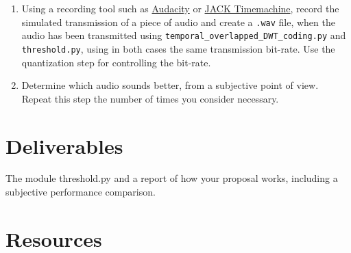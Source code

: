 \begin{enumerate}
\item Using a recording tool such as
  \href{http://audacity.sourceforge.net}{Audacity} or
  \href{http://plugin.org.uk/timemachine/}{JACK Timemachine}, record
  the simulated transmission of a piece of audio and create a
  \texttt{.wav} file, when the audio has been transmitted using
  \texttt{temporal\_overlapped\_DWT\_coding.py} and
  \texttt{threshold.py}, using in both cases the same transmission
  bit-rate. Use the quantization step for controlling the bit-rate.
\item Determine which audio sounds better, from a subjective point of
  view. Repeat this step the number of times you consider necessary.
\end{enumerate}

\section{Deliverables}

The module threshold.py and a report of how your proposal works,
including a subjective performance comparison.

\section{Resources}



